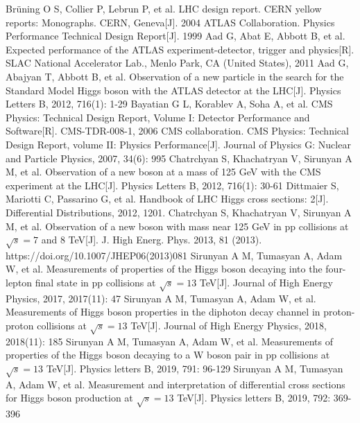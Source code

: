 \documentclass{SCIS2020cn}
\begin{document}
\begin{thebibliography}{99}
 Brüning O S, Collier P, Lebrun P, et al. LHC design report. CERN yellow reports: Monographs. CERN, Geneva[J]. 2004
 ATLAS Collaboration. Physics Performance Technical Design Report[J]. 1999
 Aad G, Abat E, Abbott B, et al. Expected performance of the ATLAS experiment-detector, trigger and physics[R]. SLAC National Accelerator Lab., Menlo Park, CA (United States), 2011
 Aad G, Abajyan T, Abbott B, et al. Observation of a new particle in the search for the Standard Model Higgs boson with the ATLAS detector at the LHC[J]. Physics Letters B, 2012, 716(1): 1-29
 Bayatian G L, Korablev A, Soha A, et al. CMS Physics: Technical Design Report, Volume I: Detector Performance and Software[R]. CMS-TDR-008-1, 2006
 CMS collaboration. CMS Physics: Technical Design Report, volume II: Physics Performance[J]. Journal of Physics G: Nuclear and Particle Physics, 2007, 34(6): 995
 Chatrchyan S, Khachatryan V, Sirunyan A M, et al. Observation of a new boson at a mass of 125 GeV with the CMS experiment at the LHC[J]. Physics Letters B, 2012, 716(1): 30-61
 Dittmaier S, Mariotti C, Passarino G, et al. Handbook of LHC Higgs cross sections: 2[J]. Differential Distributions, 2012, 1201.
 Chatrchyan S, Khachatryan V, Sirunyan A M, et al. Observation of a new boson with mass near 125 GeV in pp collisions at $\sqrt {s}= 7$ and 8 TeV[J]. J. High Energ. Phys. 2013, 81 (2013). https://doi.org/10.1007/JHEP06(2013)081
 Sirunyan A M, Tumasyan A, Adam W, et al. Measurements of properties of the Higgs boson decaying into the four-lepton final state in pp collisions at $\sqrt {s}= 13$ TeV[J]. Journal of High Energy Physics, 2017, 2017(11): 47
 Sirunyan A M, Tumasyan A, Adam W, et al. Measurements of Higgs boson properties in the diphoton decay channel in proton-proton collisions at $\sqrt {s}= 13$ TeV[J]. Journal of High Energy Physics, 2018, 2018(11): 185
 Sirunyan A M, Tumasyan A, Adam W, et al. Measurements of properties of the Higgs boson decaying to a W boson pair in pp collisions at $\sqrt {s}= 13$ TeV[J]. Physics letters B, 2019, 791: 96-129
 Sirunyan A M, Tumasyan A, Adam W, et al. Measurement and interpretation of differential cross sections for Higgs boson production at $\sqrt {s}= 13$ TeV[J]. Physics letters B, 2019, 792: 369-396

\end{thebibliography}
\end{document}
